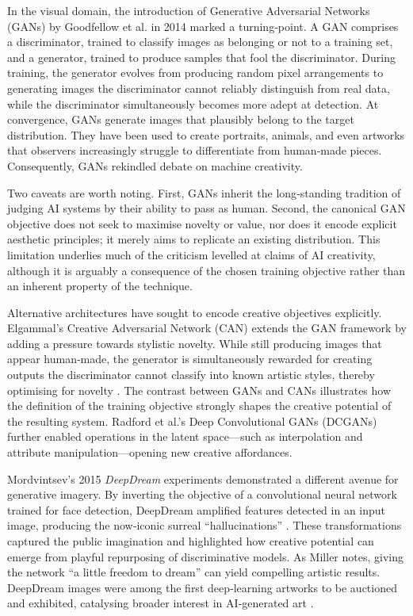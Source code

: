 In the visual domain, the introduction of Generative Adversarial Networks (GANs) by Goodfellow et al. in 2014 \cite{Goodfellow2014-ub} marked a turning‑point. A GAN comprises a discriminator, trained to classify images as belonging or not to a training set, and a generator, trained to produce samples that fool the discriminator. During training, the generator evolves from producing random pixel arrangements to generating images the discriminator cannot reliably distinguish from real data, while the discriminator simultaneously becomes more adept at detection. At convergence, GANs generate images that plausibly belong to the target distribution. They have been used to create portraits, animals, and even artworks that observers increasingly struggle to differentiate from human‑made pieces. Consequently, GANs rekindled debate on machine creativity.

Two caveats are worth noting. First, GANs inherit the long‑standing tradition of judging AI systems by their ability to pass as human. Second, the canonical GAN objective does not seek to maximise novelty or value, nor does it encode explicit aesthetic principles; it merely aims to replicate an existing distribution. This limitation underlies much of the criticism levelled at claims of AI creativity, although it is arguably a consequence of the chosen training objective rather than an inherent property of the technique.

Alternative architectures have sought to encode creative objectives explicitly. Elgammal’s Creative Adversarial Network (CAN) extends the GAN framework by adding a pressure towards stylistic novelty. While still producing images that appear human‑made, the generator is simultaneously rewarded for creating outputs the discriminator cannot classify into known artistic styles, thereby optimising for novelty \cite{Elgammal2017-ra}. The contrast between GANs and CANs illustrates how the definition of the training objective strongly shapes the creative potential of the resulting system. Radford et al.’s Deep Convolutional GANs (DCGANs) further enabled operations in the latent space—such as interpolation and attribute manipulation—opening new creative affordances.

Mordvintsev’s 2015 \emph{DeepDream} experiments demonstrated a different avenue for generative imagery. By inverting the objective of a convolutional neural network trained for face detection, DeepDream amplified features detected in an input image, producing the now‑iconic surreal “hallucinations” \cite{Miller2020-dq}. These transformations captured the public imagination \cite{Rayner2016-wx} and highlighted how creative potential can emerge from playful repurposing of discriminative models. As Miller notes, giving the network “a little freedom to dream” can yield compelling artistic results. DeepDream images were among the first deep‑learning artworks to be auctioned and exhibited, catalysing broader interest in AI‑generated art \cite{Campbell-Dollaghan2016-wd}.

